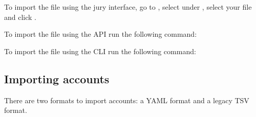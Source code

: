 \documentclass[a4paper,10pt,english,openany]{sphinxmanual}
\begin{document}
\sphinxAtStartPar
To import the file using the jury interface, go to , select
 under , select your file and click .

\sphinxAtStartPar
To import the file using the API run the following command:

\begin{sphinxVerbatim}[commandchars=\\\{\}]
      
\end{sphinxVerbatim}

\sphinxAtStartPar
To import the file using the CLI run the following command:

\begin{sphinxVerbatim}[commandchars=\\\{\}]
      
\end{sphinxVerbatim}


\subsection{Importing accounts}
\label{\detokenize{import:importing-accounts}}
\sphinxAtStartPar
There are two formats to import accounts: a YAML format and a legacy TSV format.
\end{document}
